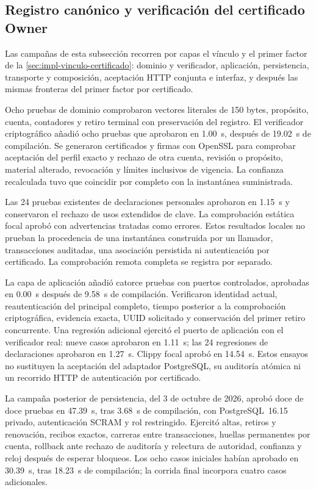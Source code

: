 \subsection{Registro canónico y verificación del certificado Owner}\label{sec:pruebas-vinculo-certificado}

Las campañas de esta subsección recorren por capas el vínculo y el primer factor
de la \cref{sec:impl-vinculo-certificado}: dominio y verificador, aplicación,
persistencia, transporte y composición, aceptación HTTP conjunta e interfaz, y
después las mismas fronteras del primer factor por certificado.

Ocho pruebas de dominio comprobaron vectores literales de 150 bytes, propósito,
cuenta, contadores y retiro terminal con preservación del registro. El verificador
criptográfico añadió ocho pruebas que aprobaron en 1.00~s, después de 19.02~s de
compilación. Se generaron certificados y firmas con OpenSSL para comprobar
aceptación del perfil exacto y rechazo de otra cuenta, revisión o propósito,
material alterado, revocación y límites inclusivos de vigencia. La confianza
recalculada tuvo que coincidir por completo con la instantánea suministrada.

Las 24 pruebas existentes de declaraciones personales aprobaron en 1.15~s y
conservaron el rechazo de usos extendidos de clave. La comprobación estática
focal aprobó con advertencias tratadas como errores. Estos resultados locales
no prueban la procedencia de una instantánea construida por un llamador,
transacciones auditadas, una asociación persistida ni autenticación por
certificado. La comprobación remota completa se registra por separado.

La capa de aplicación añadió catorce pruebas con puertos controlados, aprobadas
en 0.00~s después de 9.58~s de compilación. Verificaron identidad actual,
reautenticación del principal completo, tiempo posterior a la comprobación
criptográfica, evidencia exacta, UUID solicitado y conservación del primer
retiro concurrente. Una regresión adicional ejercitó el puerto de aplicación
con el verificador real: nueve casos aprobaron en 1.11~s; las 24 regresiones de
declaraciones aprobaron en 1.27~s. Clippy focal aprobó en 14.54~s. Estos ensayos
no sustituyen la aceptación del adaptador PostgreSQL, su auditoría atómica ni
un recorrido HTTP de autenticación por certificado.

La campaña posterior de persistencia, del 3 de octubre de 2026, aprobó doce de
doce pruebas en 47.39~s, tras 3.68~s de compilación, con PostgreSQL~16.15 privado,
autenticación SCRAM y rol restringido. Ejercitó altas, retiros y renovación,
recibos exactos, carreras entre transacciones, huellas permanentes por cuenta,
rollback ante rechazo de auditoría y relectura de autoridad, confianza y reloj
después de esperar bloqueos. Los ocho casos iniciales habían aprobado en
30.39~s, tras 18.23~s de compilación; la corrida final incorpora cuatro casos
adicionales.

